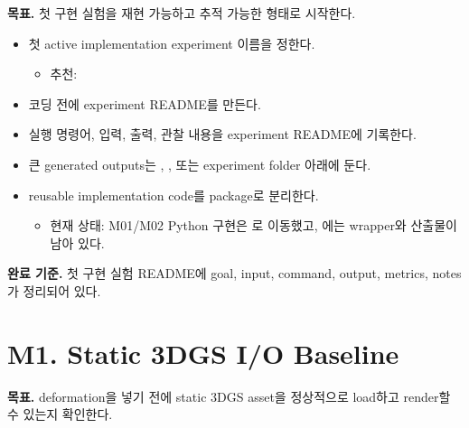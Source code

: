 \documentclass[10pt]{article}
\newcommand{\done}{\textcolor{DoneGreen}{\(\boxtimes\)}}
\begin{document}
\textbf{목표.} 첫 구현 실험을 재현 가능하고 추적 가능한 형태로 시작한다.

\begin{itemize}
  \item[\done] 첫 active implementation experiment 이름을 정한다.
    \begin{itemize}
      \item 추천: 
    \end{itemize}
  \item[\done] 코딩 전에 experiment README를 만든다.
  \item[\done] 실행 명령어, 입력, 출력, 관찰 내용을 experiment README에 기록한다.
  \item[\done] 큰 generated outputs는 , , 또는 experiment folder 아래에 둔다.
  \item[\done] reusable implementation code를  package로 분리한다.
    \begin{itemize}
      \item 현재 상태: M01/M02 Python 구현은 로 이동했고, 에는 wrapper와 산출물이 남아 있다.
    \end{itemize}
\end{itemize}

\textbf{완료 기준.} 첫 구현 실험 README에 goal, input, command, output, metrics, notes가 정리되어 있다.

\section{M1. Static 3DGS I/O Baseline}

\textbf{목표.} deformation을 넣기 전에 static 3DGS asset을 정상적으로 load하고 render할 수 있는지 확인한다.
\end{document}
